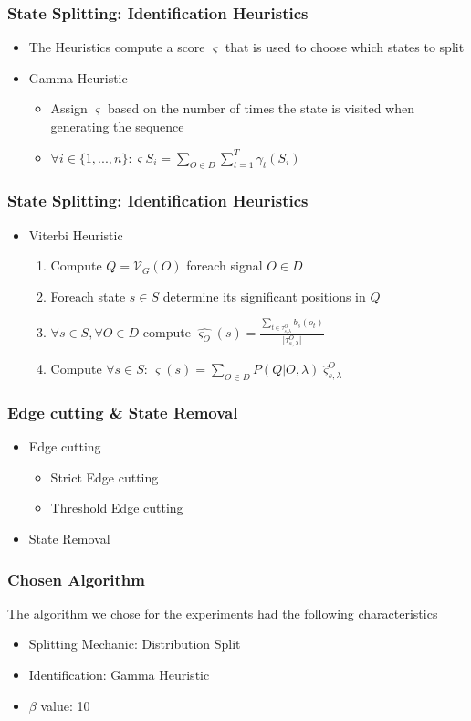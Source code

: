 \begin{frame}
  \frametitle{State Splitting: Identification Heuristics} 
  \begin{itemize}
  	\item The Heuristics compute a score $\varsigma$ that is used to choose which states to split
  	\item Gamma Heuristic
	\begin{itemize}
		\item Assign $\varsigma$ based on the number of times the state is visited when generating the sequence
		\item $\forall i \in \{1, ...,n\}: \varsigma S_i = \sum_{O \in D} \sum_{t=1}^T \gamma_t(S_i)$
	\end{itemize}
  \end{itemize}
  
\end{frame}


\begin{frame}
  \frametitle{State Splitting: Identification Heuristics} 
  \begin{itemize}
  	\item Viterbi Heuristic
  	\begin{enumerate}
  		\item Compute $Q = \mathcal{V}_G(O)$ foreach signal $O \in D$
  		\item Foreach state $s \in S$ determine its significant positions in $Q$ 
  		\item $\forall s \in S, \forall O \in D $ compute $\hat{\varsigma_O}(s) = \frac{\sum_{t \in \tau_{s,\lambda}^O} b_s(o_t)}{\vert \tau_{s,\lambda}^O \vert}$
  		\item Compute $\forall s \in S$: $\varsigma (s) = \sum_{O \in D} P(Q \vert O, \lambda) \hat{\varsigma}_{s,\lambda}^O$
  	\end{enumerate}
  \end{itemize}
  
\end{frame}

\begin{frame}
  \frametitle{Edge cutting \& State Removal} 

	\begin{itemize}
		\item Edge cutting
			\begin{itemize}
				\item Strict Edge cutting
				\item Threshold Edge cutting
			\end{itemize}
		\item State Removal
	\end{itemize}

\end{frame}


\begin{frame}
  \frametitle{Chosen Algorithm} 
	
	The algorithm we chose for the experiments had the following characteristics
	\begin{itemize}
		\item Splitting Mechanic: Distribution Split
		\item Identification: Gamma Heuristic
		\item $\beta$ value: 10
	\end{itemize}

\end{frame}








